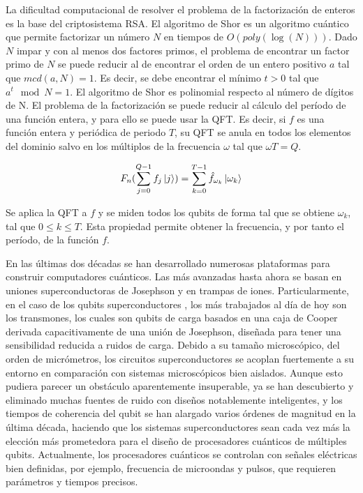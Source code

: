 La dificultad computacional de resolver el problema de la factorización de enteros es la base del criptosistema RSA. El algoritmo de Shor es un algoritmo cuántico que permite factorizar un número $N$ en tiempos de $O(poly(\log (N)))$. Dado $N$ impar y con al menos dos factores primos, el problema de encontrar un factor primo de $N$ se puede reducir al de encontrar el orden de un entero positivo $a$ tal que $mcd(a, N) = 1$. Es decir, se debe encontrar el mínimo $t > 0$ tal que $a^t \mod N = 1$. El algoritmo de Shor es polinomial respecto al número de dígitos de N. El problema de la factorización se puede reducir al cálculo del período de una función entera, y para ello se puede usar la QFT. Es decir, si $f$ es una función entera y periódica de periodo $T$, su QFT se anula en todos los elementos del dominio salvo en los múltiplos de la frecuencia $\omega$ tal que $\omega T = Q$.

\begin{equation}
    F_n (\sum_{j=0}^{Q-1} f_j \ket{j}) = \sum_{k=0}^{T-1} \hat{f}_{\omega_k} \ket{\omega_k}
\end{equation}

Se aplica la QFT a $f$ y se miden todos los qubits de forma tal que se obtiene $\omega_k$, tal que $0 \leq k \leq T$. Esta propiedad permite obtener la frecuencia, y por tanto el período, de la función $f$.

En las últimas dos décadas se han desarrollado numerosas plataformas para construir computadores cuánticos. Las más avanzadas hasta ahora se basan en uniones superconductoras de Josephson y en trampas de iones. Particularmente, en el caso de los qubits superconductores \cite{Wendin_2017, Devoret_2013, Hu_2017}, los más trabajados al día de hoy son los transmones, los cuales son qubits de carga basados en una caja de Cooper derivada capacitivamente de una unión de Josephson, diseñada para tener una sensibilidad reducida a ruidos de carga. Debido a su tamaño microscópico, del orden de micrómetros, los circuitos superconductores se acoplan fuertemente a su entorno en comparación con sistemas microscópicos bien aislados. Aunque esto pudiera parecer un obstáculo aparentemente insuperable, ya se han descubierto y eliminado muchas fuentes de ruido con diseños notablemente inteligentes, y los tiempos de coherencia del qubit se han alargado varios órdenes de magnitud \cite{Devoret_2013} en la última década, haciendo que los sistemas superconductores sean cada vez más la elección más prometedora para el diseño de procesadores cuánticos de múltiples qubits. Actualmente, los procesadores cuánticos se controlan con señales eléctricas bien definidas, por ejemplo, frecuencia de microondas y pulsos, que requieren parámetros y tiempos precisos.

